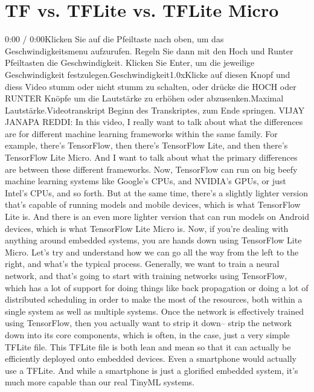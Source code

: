 {{{{{\section{TF vs. TFLite vs. TFLite Micro}

    0:00 / 0:00Klicken Sie auf die Pfeiltaste nach oben, um das Geschwindigkeitsmenu aufzurufen. Regeln Sie dann mit den Hoch und Runter Pfeiltasten die Geschwindigkeit. Klicken Sie Enter, um die jeweilige Geschwindigkeit festzulegen.Geschwindigkeit1.0xKlicke auf diesen Knopf und diess Video stumm oder nicht stumm zu schalten, oder drücke die HOCH oder RUNTER Knöpfe um die Lautstärke zu erhöhen oder abzusenken.Maximal Lautstärke.Videotranskript
    Beginn des Transkriptes, zum Ende springen.
    VIJAY JANAPA REDDI: In this video, I really want
    to talk about what the differences are for different machine learning
    frameworks within the same family.
    For example, there's TensorFlow, then there's TensorFlow Lite,
    and then there's TensorFlow Lite Micro.
    And I want to talk about what the primary differences are
    between these different frameworks.
    Now, TensorFlow can run on big beefy machine learning systems
    like Google's CPUs, and NVIDIA's GPUs, or just Intel's CPUs, and so forth.
    But at the same time, there's a slightly lighter version
    that's capable of running models and mobile devices,
    which is what TensorFlow Lite is.
    And there is an even more lighter version
    that can run models on Android devices, which is what TensorFlow Lite Micro is.
    Now, if you're dealing with anything around embedded systems,
    you are hands down using TensorFlow Lite Micro.
    Let's try and understand how we can go all the way from the left to the right,
    and what's the typical process.
    Generally, we want to train a neural network,
    and that's going to start with training networks using TensorFlow, which
    has a lot of support for doing things like back propagation
    or doing a lot of distributed scheduling in order
    to make the most of the resources, both within a single system as well
    as multiple systems.
    Once the network is effectively trained using TensorFlow,
    then you actually want to strip it down--
    strip the network down into its core components, which is often,
    in the case, just a very simple TFLite file.
    This TFLite file is both lean and mean so
    that it can actually be efficiently deployed onto embedded devices.
    Even a smartphone would actually use a TFLite.
    And while a smartphone is just a glorified embedded system,
    it's much more capable than our real TinyML systems.
}}}}}
